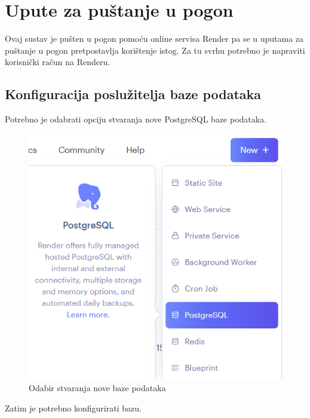			\eject 
		
		\section{Upute za puštanje u pogon}
			
			Ovaj sustav je pušten u pogon pomoću online servisa Render pa se u uputama za puštanje u pogon pretpostavlja korištenje istog. Za tu svrhu potrebno je napraviti korisnički račun na Renderu. 
			
			\subsection{Konfiguracija poslužitelja baze podataka}
			
			Potrebno je odabrati opciju stvaranja nove PostgreSQL baze podataka.
			
			\begin{figure}[H]
				\includegraphics[scale=0.8]{slike/upute/odabirStvaranjaBaze.png} %
				\centering
				\caption{Odabir stvaranja nove baze podataka}
				\label{fig:odabirStvaranjaBaze} %
			\end{figure}
			
			Zatim je potrebno konfigurirati bazu.
			
